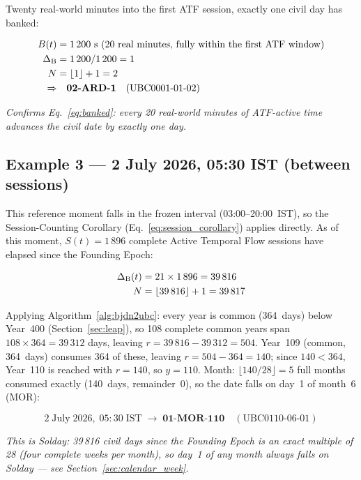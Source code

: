 \documentclass[journal,twoside]{IEEEtran}
\begin{document}
Twenty real-world minutes into the first ATF session, exactly one civil day has banked:

\begin{align}
B(t) &= 1\,200 \text{ s (20 real minutes, fully within the first ATF window)} \notag \\
\Delta_{\mathrm{B}} &= 1\,200 / 1\,200 = 1 \notag \\
N &= \lfloor 1 \rfloor + 1 = 2 \notag \\
\Rightarrow & \quad \textbf{02-ARD-1} \quad (\text{UBC0001-01-02})
\end{align}

\noindent \textit{Confirms Eq.~\eqref{eq:banked}: every 20 real-world minutes of ATF-active
time advances the civil date by exactly one day.}

\subsection{Example 3 --- 2 July 2026, 05:30 IST (between sessions)}

This reference moment falls in the frozen interval (03:00--20:00~IST), so the
Session-Counting Corollary (Eq.~\eqref{eq:session_corollary}) applies directly. As of this
moment, $S(t) = 1\,896$ complete Active Temporal Flow sessions have elapsed since the
Founding Epoch:

\begin{align}
\Delta_{\mathrm{B}}(t) &= 21 \times 1\,896 = 39\,816 \notag \\
N &= \lfloor 39\,816 \rfloor + 1 = 39\,817
\end{align}

Applying Algorithm~\ref{alg:bjdn2ubc}: every year is common (364~days) below Year~400
(Section~\ref{sec:leap}), so 108 complete common years span $108 \times 364 = 39\,312$ days,
leaving $r = 39\,816 - 39\,312 = 504$. Year~109 (common, 364~days) consumes 364 of these,
leaving $r = 504 - 364 = 140$; since $140 < 364$, Year~110 is reached with $r = 140$, so
$y = 110$. Month: $\lfloor 140/28 \rfloor = 5$ full months consumed exactly (140~days,
remainder~0), so the date falls on day~1 of month~6 (MOR):

\begin{equation}
2\;\text{July}\;2026,\;05{:}30\;\text{IST} \;\longrightarrow\; \textbf{01-MOR-110}
\quad (\text{UBC0110-06-01})
\end{equation}

\noindent \textit{This is Solday: 39\,816 civil days since the Founding Epoch is an exact
multiple of 28 (four complete weeks per month), so day~1 of any month always falls on
Solday --- see Section~\ref{sec:calendar_week}.}
\end{document}
